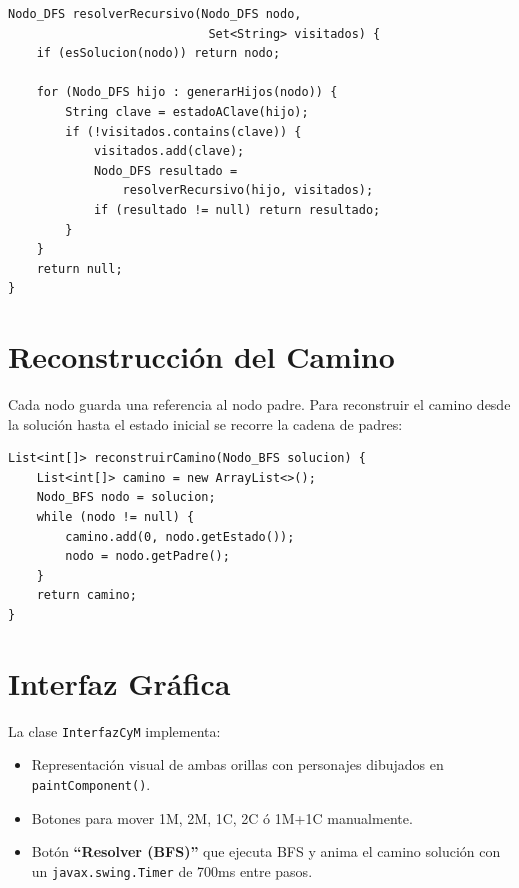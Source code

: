 \documentclass[12pt,a4paper]{article}
\begin{document}
\begin{lstlisting}
Nodo_DFS resolverRecursivo(Nodo_DFS nodo,
                            Set<String> visitados) {
    if (esSolucion(nodo)) return nodo;

    for (Nodo_DFS hijo : generarHijos(nodo)) {
        String clave = estadoAClave(hijo);
        if (!visitados.contains(clave)) {
            visitados.add(clave);
            Nodo_DFS resultado =
                resolverRecursivo(hijo, visitados);
            if (resultado != null) return resultado;
        }
    }
    return null;
}
\end{lstlisting}

\section{Reconstrucción del Camino}

Cada nodo guarda una referencia al nodo padre. Para reconstruir el camino desde la solución hasta el estado inicial se recorre la cadena de padres:

\begin{lstlisting}
List<int[]> reconstruirCamino(Nodo_BFS solucion) {
    List<int[]> camino = new ArrayList<>();
    Nodo_BFS nodo = solucion;
    while (nodo != null) {
        camino.add(0, nodo.getEstado());
        nodo = nodo.getPadre();
    }
    return camino;
}
\end{lstlisting}

\section{Interfaz Gráfica}

La clase \texttt{InterfazCyM} implementa:
\begin{itemize}
  \item Representación visual de ambas orillas con personajes dibujados en \texttt{paintComponent()}.
  \item Botones para mover 1M, 2M, 1C, 2C ó 1M+1C manualmente.
  \item Botón \textbf{``Resolver (BFS)''} que ejecuta BFS y anima el camino solución con un \texttt{javax.swing.Timer} de 700ms entre pasos.
\end{itemize}
\end{document}
